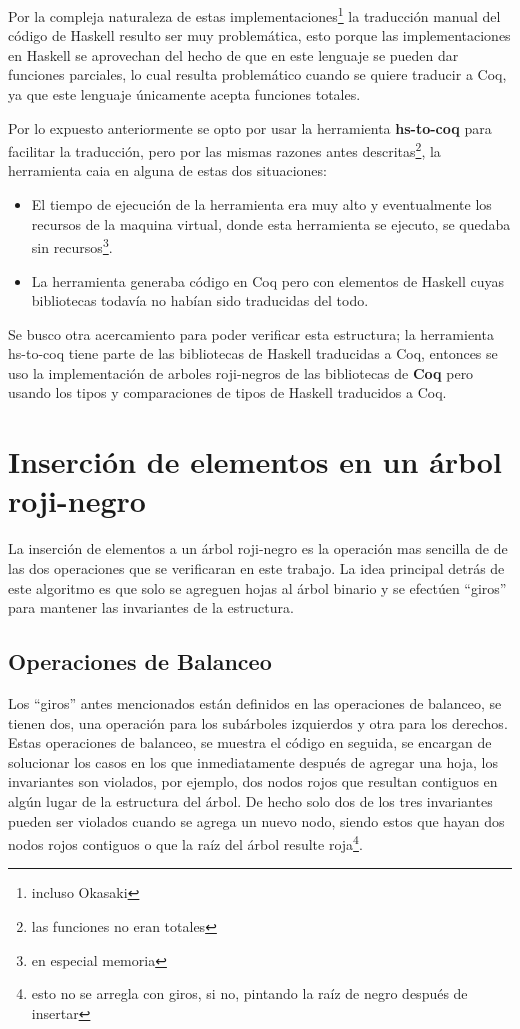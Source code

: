\documentclass[letterpaper,12pt,oneside]{book}
\newcommand{\coq}{\textbf{Coq}}
\newcommand{\arn}{árbol roji-negro}
\newcommand{\arns}{arboles roji-negros}
\theoremstyle{plain}
\theoremstyle{definition}
\theoremstyle{remark}
\begin{document}
Por la compleja naturaleza de estas implementaciones\footnote{incluso Okasaki} la traducción manual del 
código de Haskell resulto ser muy problemática,
esto porque las implementaciones en Haskell se aprovechan del hecho de que en este lenguaje se pueden dar
funciones parciales, lo cual resulta problemático cuando se quiere traducir a Coq, ya que este lenguaje 
únicamente acepta funciones totales.

Por lo expuesto anteriormente se opto por usar la herramienta \textbf{hs-to-coq} para facilitar la 
traducci\'on, pero por las mismas razones antes descritas\footnote{las funciones no eran totales},
la herramienta caia en alguna de estas dos situaciones:

\begin{itemize}
    \item El tiempo de ejecuci\'on de la herramienta era muy alto y eventualmente los recursos de la 
    maquina virtual, donde esta herramienta se ejecuto, se quedaba sin recursos\footnote{en especial 
    memoria}.
    \item La herramienta generaba c\'odigo en Coq pero con elementos de Haskell cuyas bibliotecas todavía
    no habían sido traducidas del todo.
\end{itemize}{}

Se busco otra acercamiento para poder verificar esta estructura; la herramienta hs-to-coq tiene parte de 
las bibliotecas de Haskell traducidas a Coq, entonces se uso la implementación de {\arns} de las 
bibliotecas de {\coq}\cite{MSetRBT} pero usando los tipos y comparaciones de tipos de Haskell traducidos 
a Coq.

\section{Inserción de elementos en un {{{\arn}}}}

La inserci\'on de elementos a un {{{\arn}}} es la operaci\'on mas sencilla de de las dos operaciones que 
se verificaran en este trabajo. La idea principal detrás de este algoritmo es que solo se agreguen hojas 
al \'arbol binario y se efectúen ``giros'' para mantener las invariantes de la estructura.

\subsection{Operaciones de Balanceo}
Los ``giros'' antes mencionados están definidos en las operaciones de balanceo, se tienen dos, una 
operaci\'on para los subárboles izquierdos y otra para los derechos. Estas operaciones de balanceo, se 
muestra el c\'odigo en seguida, se encargan de solucionar los casos en los que inmediatamente después de 
agregar una hoja, los invariantes son violados, por ejemplo, dos nodos rojos que resultan contiguos en 
algún lugar de la estructura del \'arbol. De hecho solo dos de los tres invariantes pueden ser violados 
cuando se agrega un nuevo nodo, siendo estos que hayan dos nodos rojos contiguos o que la raíz del árbol 
resulte roja\footnote{esto no se arregla con giros, si no, pintando la raíz de negro después de 
insertar}.
\end{document}
